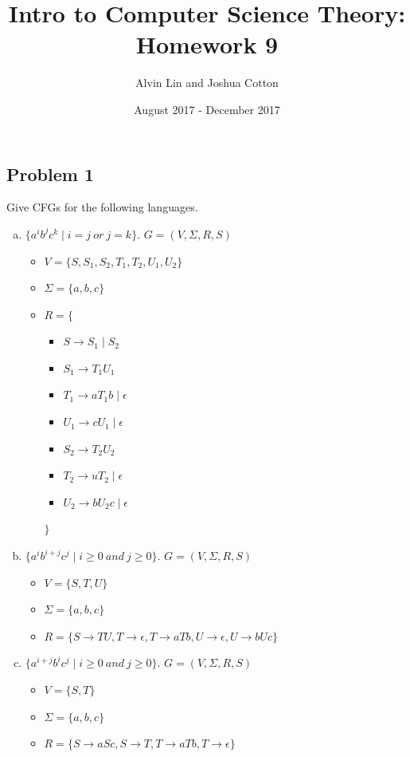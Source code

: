 \documentclass{math}
\title{Intro to Computer Science Theory: Homework 9}
\author{Alvin Lin and Joshua Cotton}
\date{August 2017 - December 2017}
\begin{document}
\maketitle

\subsection*{Problem 1}
Give CFGs for the following languages.
\begin{enumerate}[(a)]
  \item \( \{a^ib^jc^k\mid i=j~or~j=k\} \). \( G = (V,\Sigma,R,S) \)
  \begin{itemize}
    \item \( V = \{S,S_1,S_2,T_1,T_2,U_1,U_2\} \)
    \item \( \Sigma = \{a,b,c\} \)
    \item \( R = \{ \)
    \begin{itemize}
      \item \( S \to S_1\mid S_2 \)
      \item \( S_1 \to T_1U_1 \)
      \item \( T_1 \to aT_1b\mid\epsilon \)
      \item \( U_1 \to cU_1\mid\epsilon \)
      \item \( S_2 \to T_2U_2 \)
      \item \( T_2 \to uT_2\mid\epsilon \)
      \item \( U_2 \to bU_2c\mid\epsilon \)
    \end{itemize}
    \( \} \)
  \end{itemize}
  \item \( \{a^ib^{i+j}c^j\mid i\ge0~and~j\ge0\} \). \( G = (V,\Sigma,R,S) \)
  \begin{itemize}
    \item \( V = \{S,T,U\} \)
    \item \( \Sigma = \{a,b,c\} \)
    \item \( R = \{S\to TU, T\to\epsilon,T\to aTb,U\to\epsilon,U\to bUc\} \)
  \end{itemize}
  \item \( \{a^{i+j}b^ic^j\mid i\ge0~and~j\ge0\} \). \( G = (V,\Sigma,R,S) \)
  \begin{itemize}
    \item \( V = \{S,T\} \)
    \item \( \Sigma = \{a,b,c\} \)
    \item \( R = \{S\to aSc, S\to T, T\to aTb, T\to\epsilon\} \)
  \end{itemize}
\end{enumerate}
\end{document}
